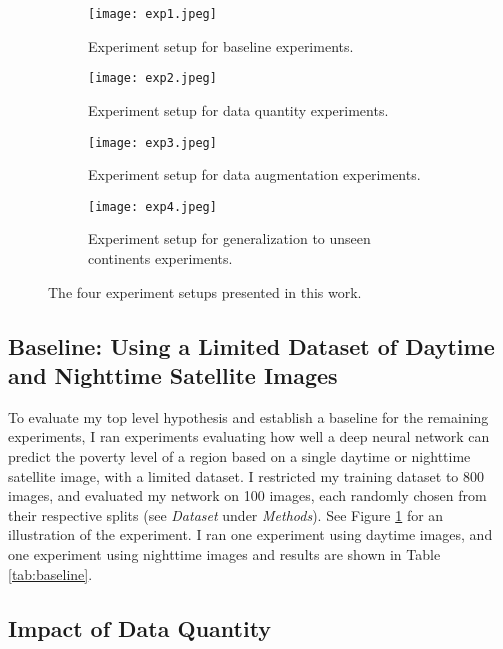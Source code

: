 \documentclass{article}
\begin{document}
\begin{figure}[h!]
    \begin{subfigure}{.47\textwidth}
        \centering
        \texttt{[image: exp1.jpeg]}
        \caption{Experiment setup for baseline experiments.}
        \label{fig:exp_baseline}
    \end{subfigure}
        \begin{subfigure}{.47\textwidth}
        \centering
        \texttt{[image: exp2.jpeg]}
        \caption{Experiment setup for data quantity experiments.}
        \label{fig:exp_quantity}
    \end{subfigure}
    \begin{subfigure}{.47\textwidth}
        \centering
        \texttt{[image: exp3.jpeg]}
        \caption{Experiment setup for data augmentation experiments.}
        \label{fig:exp_augmentation}
    \end{subfigure}
        \begin{subfigure}{.47\textwidth}
        \centering
        \texttt{[image: exp4.jpeg]}
        \caption{Experiment setup for generalization to unseen continents experiments.}
        \label{fig:exp_generalization}
    \end{subfigure}
    \caption{The four experiment setups presented in this work.}
    \label{fig:experiment_setup}
\end{figure}

\subsection{Baseline: Using a Limited Dataset of Daytime and Nighttime Satellite Images}
To evaluate my top level hypothesis and establish a baseline for the remaining experiments, I ran experiments evaluating how well a deep neural network can predict the poverty level of a region based on a single daytime or nighttime satellite image, with a limited dataset. I restricted my training dataset to 800 images, and evaluated my network on 100 images, each randomly chosen from their respective splits (see \emph{Dataset} under \emph{Methods}). See Figure \ref{fig:exp_baseline} for an illustration of the experiment. I ran one experiment using daytime images, and one experiment using nighttime images and results are shown in Table \ref{tab:baseline}.


\subsection{Impact of Data Quantity}
\end{document}
